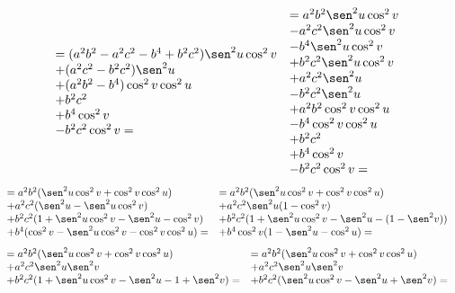 \documentclass{article}
\begin{document}
$$
\begin{array}{l}
  = (a^2b^2 - a^2c^2 - b^4 + b^2c^2) \sen^2 u \cos^2 v \\
  + (a^2c^2 - b^2c^2)\sen^2 u \\
  + (a^2b^2-b^4) \cos^2 v \cos^2 u \\
  + b^2 c^2 \\
  + b^4 \cos^2 v \\
  - b^2c^2 \cos^2 v =
\end{array}
\begin{array}{l}
  = a^2b^2 \sen^2 u \cos^2 v \\
  - a^2c^2 \sen^2 u \cos^2 v \\
  - b^4 \sen^2 u \cos^2 v \\
  + b^2c^2 \sen^2 u \cos^2 v \\
  + a^2c^2 \sen^2 u \\
  - b^2c^2 \sen^2 u \\
  + a^2b^2 \cos^2 v \cos^2 u \\
  - b^4 \cos^2 v \cos^2 u \\
  + b^2c^2 \\
  + b^4 \cos^2 v \\
  - b^2c^2 \cos^2 v =
\end{array}
$$
$$
\begin{array}{l}
  = a^2b^2 (\sen^2 u \cos^2 v + \cos^2 v \cos^2 u) \\
  + a^2c^2 (\sen^2 u - \sen^2 u \cos^2 v) \\
  + b^2c^2 (1 + \sen^2 u \cos^2 v - \sen^2 u - \cos^2 v)\\
  + b^4 (\cos^2 v - \sen^2 u \cos^2 v - \cos^2 v \cos^2 u) =
\end{array}
\begin{array}{l}
  = a^2b^2 (\sen^2 u \cos^2 v + \cos^2 v \cos^2 u) \\
  + a^2c^2 \sen^2 u (1 - \cos^2 v) \\
  + b^2c^2 (1 + \sen^2 u \cos^2 v - \sen^2 u - (1 - \sen^2 v))\\
  + b^4 \cos^2 v (1 - \sen^2 u - \cos^2 u) =
\end{array}
$$
$$
\begin{array}{l}
  = a^2b^2 (\sen^2 u \cos^2 v + \cos^2 v \cos^2 u) \\
  + a^2c^2 \sen^2 u \sen^2 v \\
  + b^2c^2 (1 + \sen^2 u \cos^2 v - \sen^2 u - 1 + \sen^2 v) =
\end{array}
\begin{array}{l}
  = a^2b^2 (\sen^2 u \cos^2 v + \cos^2 v \cos^2 u) \\
  + a^2c^2 \sen^2 u \sen^2 v \\
  + b^2c^2 (\sen^2 u \cos^2 v - \sen^2 u + \sen^2 v) =
\end{array}
$$
\end{document}
